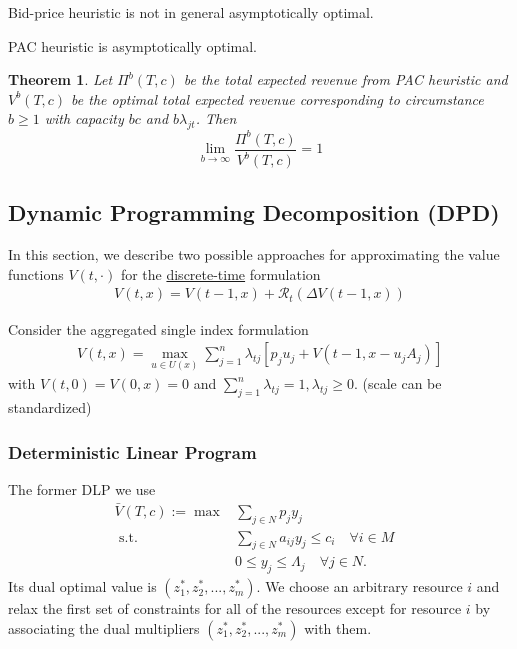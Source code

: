 \documentclass[11pt,a4paper]{article}
\newtheorem{theorem}{Theorem}
\begin{document}
Bid-price heuristic is not in general asymptotically optimal.

PAC heuristic is asymptotically optimal.
\begin{theorem}
Let $\Pi^b(T,c)$ be the total expected revenue from PAC heuristic and $V^b(T,c)$ be the optimal total expected revenue corresponding to circumstance $b\geq 1$ with capacity $bc$ and $b\lambda_{jt}$. Then $$\lim_{b \rightarrow \infty}\frac{\Pi^b(T,c)}{V^b(T,c)}=1$$
\end{theorem}

\subsection{Dynamic Programming Decomposition (DPD)}
In this section, we describe two possible approaches for approximating the value functions $V (t, \cdot)$ for the \underline{discrete-time} formulation
\begin{equation}
    \begin{aligned}
        V(t, x)=V(t-1, x)+\mathcal{R}_{t}(\Delta V(t-1, x))
    \end{aligned}
    \nonumber
\end{equation}


Consider the aggregated single index formulation
\begin{equation}
    \begin{aligned}
        V(t,x)=\max_{u\in U(x)}\sum_{j=1}^n\lambda_{tj}[p_ju_j+V(t-1,x-u_jA_j)]
    \end{aligned}
    \nonumber
\end{equation}
with $V(t,0)=V(0,x)=0$ and $\sum_{j=1}^n\lambda_{tj}=1,\lambda_{tj}\geq 0$. (scale can be standardized)

\subsubsection{Deterministic Linear Program}
The former DLP we use
$$\begin{array}{rlr}
    \bar{V}(T, c):=\max & \sum_{j \in N} p_{j} y_{j} & \\
    \text { s.t. } & \sum_{j \in N} a_{i j} y_{j} \leq c_{i} \quad \forall i \in M \\
    & 0 \leq y_{j} \leq \Lambda_{j} \quad \forall j \in N .
\end{array}$$
Its dual optimal value is $(z_1^*,z_2^*,...,z_m^*)$. We choose an arbitrary resource $i$ and relax the first set of constraints for all of the resources except for resource $i$ by associating the dual multipliers $(z_1^*,z_2^*,...,z_m^*)$ with them.
\end{document}
